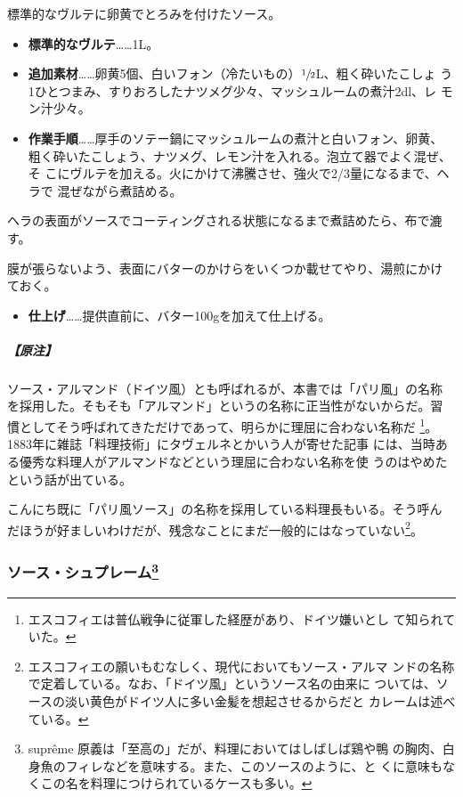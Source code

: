 \documentclass[twoside,12Q,b5j]{escoffierltjsbook}
\def\tightlist{\itemsep1pt\parskip0pt\parsep0pt}
\begin{document}
標準的なヴルテに卵黄でとろみを付けたソース。

\begin{itemize}
\item
  \textbf{標準的なヴルテ}\ldots{}\ldots{}1L。
\item
  \textbf{追加素材}\ldots{}\ldots{}卵黄5個、白いフォン（冷たいもの）\(\sfrac{1}{2}\)L、粗く砕いたこしょ
  う1ひとつまみ、すりおろしたナツメグ少々、マッシュルームの煮汁2dl、レ
  モン汁少々。
\item
  \textbf{作業手順}\ldots{}\ldots{}厚手のソテー鍋にマッシュルームの煮汁と白いフォン、卵黄、
  粗く砕いたこしょう、ナツメグ、レモン汁を入れる。泡立て器でよく混ぜ、そ
  こにヴルテを加える。火にかけて沸騰させ、強火で2/3量になるまで、ヘラで
  混ぜながら煮詰める。
\end{itemize}

ヘラの表面がソースでコーティングされる状態になるまで煮詰めたら、布で漉す。

膜が張らないよう、表面にバターのかけらをいくつか載せてやり、湯煎にかけ
ておく。

\begin{itemize}
\tightlist
\item
  \textbf{仕上げ}\ldots{}\ldots{}提供直前に、バター100gを加えて仕上げる。
\end{itemize}

\subparagraph{【原注】}\label{ux539fux6ce8-3}

ソース・アルマンド（ドイツ風）とも呼ばれるが、本書では「パリ風」の名称
を採用した。そもそも「アルマンド」というの名称に正当性がないからだ。習
慣としてそう呼ばれてきただけであって、明らかに理屈に合わない名称だ
\footnote{エスコフィエは普仏戦争に従軍した経歴があり、ドイツ嫌いとし
  て知られていた。}。1883年に雑誌「料理技術」にタヴェルネとかいう人が寄せた記事
には、当時ある優秀な料理人がアルマンドなどという理屈に合わない名称を使
うのはやめたという話が出ている。

こんにち既に「パリ風ソース」の名称を採用している料理長もいる。そう呼ん
だほうが好ましいわけだが、残念なことにまだ一般的にはなっていない\footnote{エスコフィエの願いもむなしく、現代においてもソース・アルマ
  ンドの名称で定着している。なお、「ドイツ風」というソース名の由来に
  ついては、ソースの淡い黄色がドイツ人に多い金髪を想起させるからだと
  カレームは述べている。}。

\vspace*{1.7\zw}

\subsubsection[ソース・シュプレーム]{\texorpdfstring{ソース・シュプレーム\footnote{suprême
  原義は「至高の」だが、料理においてはしばしば鶏や鴨
  の胸肉、白身魚のフィレなどを意味する。また、このソースのように、と
  くに意味もなくこの名を料理につけられているケースも多い。}}{ソース・シュプレーム}}\label{ux30bdux30fcux30b9ux30b7ux30e5ux30d7ux30ecux30fcux30e0102023}
\end{document}
